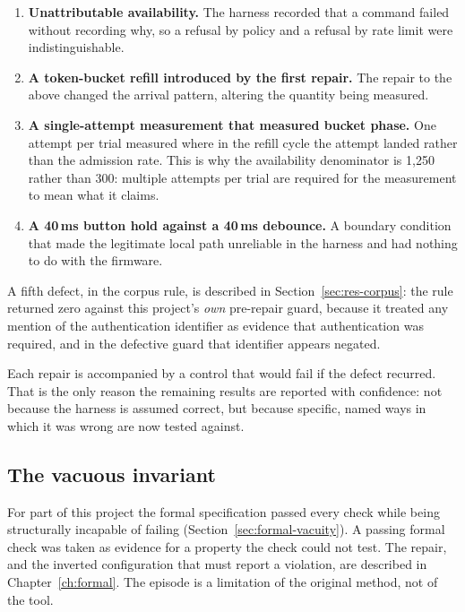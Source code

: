 \begin{enumerate}[leftmargin=1.8em,itemsep=4pt]
  \item \textbf{Unattributable availability.} The harness recorded that a command failed without
        recording why, so a refusal by policy and a refusal by rate limit were indistinguishable.
  \item \textbf{A token-bucket refill introduced by the first repair.} The repair to the above
        changed the arrival pattern, altering the quantity being measured.
  \item \textbf{A single-attempt measurement that measured bucket phase.} One attempt per trial
        measured where in the refill cycle the attempt landed rather than the admission rate.
        This is why the availability denominator is 1,250 rather than 300: multiple attempts per
        trial are required for the measurement to mean what it claims.
  \item \textbf{A 40\,ms button hold against a 40\,ms debounce.} A boundary condition that made
        the legitimate local path unreliable in the harness and had nothing to do with the
        firmware.
\end{enumerate}

A fifth defect, in the corpus rule, is described in Section~\ref{sec:res-corpus}: the rule
returned zero against this project's \emph{own} pre-repair guard, because it treated any mention
of the authentication identifier as evidence that authentication was required, and in the
defective guard that identifier appears negated.

Each repair is accompanied by a control that would fail if the defect recurred. That is the only
reason the remaining results are reported with confidence: not because the harness is assumed
correct, but because specific, named ways in which it was wrong are now tested against.

\subsection{The vacuous invariant}

For part of this project the formal specification passed every check while being structurally
incapable of failing (Section~\ref{sec:formal-vacuity}). A passing formal check was taken as
evidence for a property the check could not test. The repair, and the inverted configuration that
must report a violation, are described in Chapter~\ref{ch:formal}. The episode is a limitation of
the original method, not of the tool.

